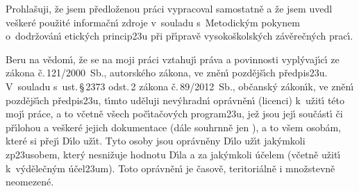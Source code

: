 \documentclass[czech,master,unicode]{ctufit-thesis}
\theoremstyle{plain}
\theoremstyle{definition}
\theoremstyle{remark}
\numberwithin{theorem}{chapter}
\begin{document}
\begin{declarationpage}
Prohla\v suji, \v ze jsem p\v redlo\v zenou pr\'aci vypracoval samostatn\v e a \v ze jsem uvedl ve\v sker\'e
pou\v zit\'e informa\v cn\'\i{} zdroje v~souladu s~Metodick\'ym pokynem o~do\-dr\v zo\-v\'an\'\i{} etick\'ych
princip\accent23u p\v ri p\v r\'\i{}prav\v e vysoko\v skolsk\'ych z\'av\v ere\v cn\'ych prac\'\i{}.

Beru na v\v edom\'\i{}, \v ze se na moji pr\'aci vztahuj\'\i{} pr\'ava a povinnosti vy\-pl\'y\-va\-j\'\i{}c\'\i{} ze z\'akona
\v c.\,121/2000~Sb., autorsk\'eho z\'akona, ve zn\v en\'\i{} pozd\v ej\v s\'\i{}ch p\v redpis\accent23u. V~souladu s~ust.\,\S{}\,2373 odst.\,2 z\'akona \v c.\,89/2012~Sb., ob\v cansk\'y z\'akon\'\i{}k, ve zn\v en\'\i{} pozd\v ej\v s\'\i{}ch p\v redpis\accent23u,
t\'\i{}mto ud\v eluji nev\'yhradn\'\i{} opr\'avn\v en\'\i{} (licenci) k~u\v zit\'\i{} t\'eto moj\'\i{} pr\'ace, a to v\v cetn\v e v\v sech
po\v c\'\i{}ta\v cov\'ych program\accent23u, je\v z jsou jej\'\i{} sou\v c\'ast\'\i{} \v ci p\v r\'\i{}lohou a ve\v sker\'e jejich
dokumentace (d\'ale souhrnn\v e jen ), a to v\v sem osob\'am, kter\'e si p\v rej\'\i{} D\'\i{}lo u\v z\'\i{}t.
Tyto osoby jsou opr\'avn\v eny D\'\i{}lo u\v z\'\i{}t jak\'ymkoli zp\accent23usobem, kter\'y nesni\v zuje hodnotu
D\'\i{}la a za jak\'ymkoli \'u\v celem (v\v cetn\v e u\v zit\'\i{} k~v\'yd\v ele\v cn\'ym \'u\v cel\accent23um). Toto opr\'avn\v en\'\i{} je
\v casov\v e, teritori\'aln\v e i mno\v zstevn\v e neomezen\'e. 

\end{declarationpage}

\printabstractpage %
\end{document}
